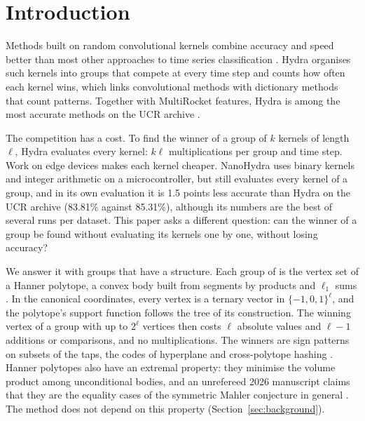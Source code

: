 \section{Introduction}
\label{sec:introduction}

Methods built on random convolutional kernels combine accuracy and speed better than most
other approaches to time series classification
\citep{dempster2020rocket,dempster2021minirocket,tan2022multirocket,middlehurst2024bakeoff}.
Hydra \citep{dempster2023hydra} organises such kernels into groups that compete at every
time step and counts how often each kernel wins, which links convolutional methods with
dictionary methods that count patterns. Together with MultiRocket features, Hydra is among
the most accurate methods on the UCR archive \citep{middlehurst2024bakeoff}.

The competition has a cost. To find the winner of a group of $k$ kernels of length $\ell$,
Hydra evaluates every kernel: $k\ell$ multiplications per group and time step. Work on edge
devices makes each kernel cheaper. NanoHydra \citep{cioflan2025nanohydra} uses binary
kernels and integer arithmetic on a microcontroller, but still evaluates every kernel of a
group, and in its own evaluation it is 1.5 points less accurate than Hydra on the UCR
archive (83.81\% against 85.31\%), although its numbers are the best of several runs per
dataset. This paper asks a different question: can the winner of a group be found without
evaluating its kernels one by one, without losing accuracy?

We answer it with groups that have a structure. Each group of \hh{} is the vertex set of a
Hanner polytope, a convex body built from segments by products and $\ell_1$ sums
\citep{hanner1956intersections,hansen1981structure}. In the canonical coordinates, every
vertex is a ternary vector in $\{-1,0,1\}^\ell$, and the polytope's support function follows
the tree of its construction. The winning vertex of a group with up to $2^\ell$ vertices
then costs $\ell$ absolute values and $\ell-1$ additions or comparisons, and no
multiplications. The winners are sign patterns on subsets of the taps, the codes of
hyperplane and cross-polytope hashing \citep{charikar2002simhash,andoni2015crosspolytope}.
Hanner polytopes also have an extremal property: they minimise the volume product among
unconditional bodies, and an unrefereed 2026 manuscript claims that they are the equality
cases of the symmetric Mahler conjecture in general \citep{openai2026mahler}. The method does
not depend on this property (Section~\ref{sec:background}).

